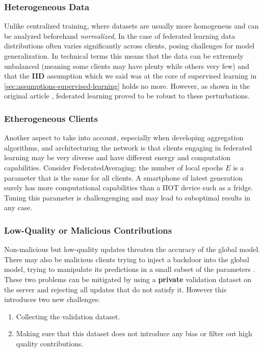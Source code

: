 \subsubsection{Heterogeneous Data}
Unlike centralized training, where datasets are usually more homogeneus and can be analyzed beforehand
\textit{normalized},
In the case of federated learning data distributions often varies significantly across clients, posing
challenges for model generalization.
In technical terms this means that the data can be extremely unbalanced (meaning some clients may have plenty while
others very few) and that the \textbf{IID} assumption which we said was at the core of supervised learning in
\ref{sec:assumptions-supervised-learning} holds no more.
However, as shown in the original article \cite{McMahan2016}, federated learning proved to be robust to these
perturbations.

\subsubsection{Etherogeneous Clients}
Another aspect to take into account, especially when developing aggregation algorithms, and architecturing the network
is that clients engaging in federated learning may be very diverse and have different energy and computation
capabilities.
Consider FederatedAveraging: the number of local epochs \(E\) is a parameter that is the same for all clients.
A smartphone of latest generation surely has more computational capabilities than a IIOT device such as a fridge.
Tuning this parameter is challengenging and may lead to suboptimal results in any case.

\subsubsection{Low-Quality or Malicious Contributions}
Non-malicious but low-quality updates threaten the accuracy of the global model.
There may also be malicious clients trying to inject a backdoor into the global model, trying to manipulate
its predictions in a small subset of the parameters \cite{backdoorFL}.
These two problems can be mitigated by using a \textbf{private} validation dataset on the server and
rejecting all updates that do not satisfy it.
However this introduces two new challenges:
\begin{enumerate}
  \item Collecting the validation dataset.
  \item Making sure that this dataset does not introduce any bias or filter out high quality contributions.
\end{enumerate}

